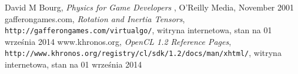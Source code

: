 \begin{thebibliography}{999}

 David M Bourg, \emph{Physics for Game Developers }, O'Reilly Media, November 2001
gafferongames.com, \emph{Rotation and Inertia Tensors}, \texttt{http://gafferongames.com/virtualgo/}, witryna internetowa, stan na 01 września 2014
www.khronos.org, \emph{OpenCL 1.2 Reference Pages}, \texttt{http://www.khronos.org/registry/cl/sdk/1.2/docs/man/xhtml/}, witryna internetowa, stan na 01 września 2014
\end{thebibliography}
